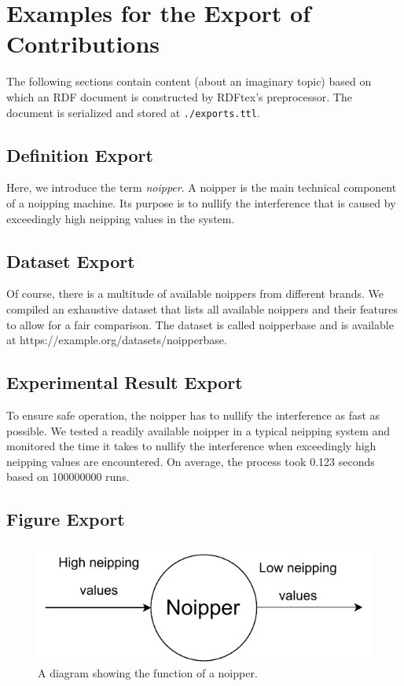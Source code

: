 
\section{Examples for the Export of Contributions}

The following sections contain content (about an imaginary topic) based on which an RDF document is constructed by RDFtex's preprocessor. The document is serialized and stored at \texttt{./exports.ttl}.

\subsection{Definition Export}

Here, we introduce the term \emph{noipper}. A noipper is the main technical component of a noipping machine. Its purpose is to nullify the interference that is caused by exceedingly high neipping values in the system.

\subsection{Dataset Export}

Of course, there is a multitude of available noippers from different brands. We compiled an exhaustive dataset that lists all available noippers and their features to allow for a fair comparison. The dataset is called noipperbase and is available at https://example.org/datasets/noipperbase.

\subsection{Experimental Result Export}

To ensure safe operation, the noipper has to nullify the interference as fast as possible. We tested a readily available noipper in a typical neipping system and monitored the time it takes to nullify the interference when exceedingly high neipping values are encountered. On average, the process took 0.123 seconds based on 100000000 runs.  

\subsection{Figure Export}

\begin{figure}[htb!]
\centering
\includegraphics[width=0.8\columnwidth]{./figures/noipper_function}
\caption{A diagram showing the function of a noipper.}
\label{fig:scikg-structure}
\end{figure}

